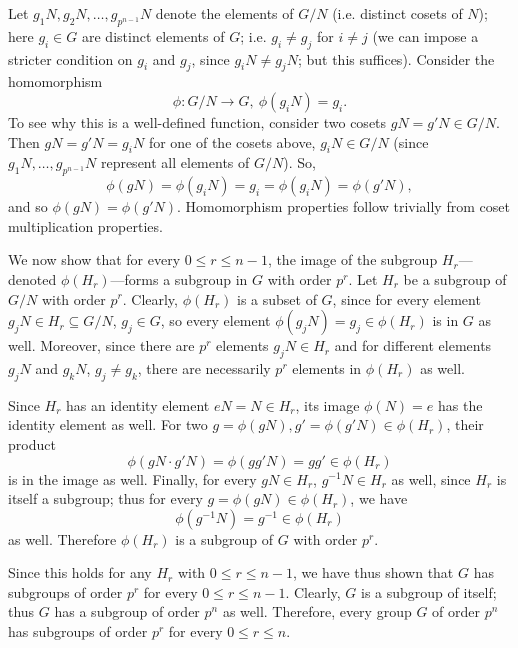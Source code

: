 \documentclass{homework}
\begin{document}
\begin{solution}
  Let $g_1N,g_2N,\ldots,g_{p^{n-1}}N$ denote the elements of $G / N$ (i.e. distinct cosets of $N$);
  here $g_i\in G$ are distinct elements of $G$; i.e. $g_i\neq g_j$ for $i\neq j$ (we can impose a
  stricter condition on $g_i$ and $g_j$, since $g_iN\neq g_jN$; but this suffices). Consider the
  homomorphism \[
    \phi: G / N\longrightarrow G,\ \phi(g_iN)=g_i
  .\] To see why this is a well-defined function, consider two cosets $gN=g'N\in G / N$. Then
  $gN=g'N=g_iN$ for one of the cosets above, $g_iN\in G / N$ (since $g_1N,\ldots,g_{p^{n-1}}N$
  represent all elements of $G / N$). So, \[
    \phi(gN)=\phi(g_iN)=g_i=\phi(g_iN)=\phi(g'N)
  ,\] and so $\phi(gN)=\phi(g'N)$. Homomorphism properties follow trivially from coset
  multiplication properties.

  We now show that for every $0\le r\le n-1$, the image of the subgroup $H_r$---denoted
  $\phi(H_r)$---forms a subgroup in $G$ with order $p^r$. Let $H_r$ be a subgroup of $G / N$ with
  order $p^r$. Clearly, $\phi(H_r)$ is a subset of $G$, since for every element $g_jN\in
  H_r\subseteq G / N$, $g_j\in G$, so every element $\phi(g_jN)=g_j\in \phi(H_r)$ is in $G$ as well.
  Moreover, since there are $p^r$ elements $g_jN\in H_r$ and for different elements $g_jN$ and
  $g_kN$, $g_j\neq g_k$, there are necessarily $p^r$ elements in $\phi(H_r)$ as well.

  Since $H_r$ has an identity element $eN=N\in H_r$, its image $\phi(N)=e$ has the identity element
  as well. For two $g=\phi(gN),g'=\phi(g'N)\in \phi(H_r)$, their product \[
    \phi(gN\cdot g'N)=\phi(gg'N)=gg'\in \phi(H_r)
  \] is in the image as well. Finally, for every $gN\in H_r$, $g^{-1}N\in H_r$ as well, since $H_r$
  is itself a subgroup; thus for every $g=\phi(gN)\in \phi(H_r)$, we have \[
    \phi(g^{-1}N)=g^{-1}\in \phi(H_r)
  \] as well. Therefore $\phi(H_r)$ is a subgroup of $G$ with order $p^r$.

  Since this holds for any $H_r$ with $0\le r\le n-1$, we have thus shown that $G$ has subgroups of
  order $p^r$ for every $0\le r\le n-1$. Clearly, $G$ is a subgroup of itself; thus $G$ has a
  subgroup of order $p^n$ as well. Therefore, every group $G$ of order $p^n$ has subgroups of order
  $p^r$ for every $0\le r\le n$.
  
\end{solution}
\end{document}
